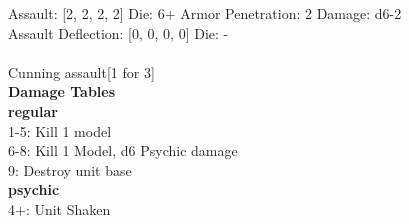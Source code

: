 Assault: [2, 2, 2, 2] Die: 6+ Armor Penetration: 2 Damage: d6-2 \\
Assault Deflection: [0, 0, 0, 0] Die: -\\
\\ 
Cunning assault[1 for 3]\\ 
 



 





{\bf Damage Tables} \\
 {\bf regular } \\
1-5: Kill 1 model \\
6-8: Kill 1 Model, d6 Psychic damage \\
9: Destroy unit base \\
 {\bf psychic } \\
4+: Unit Shaken \\










\pagebreak
